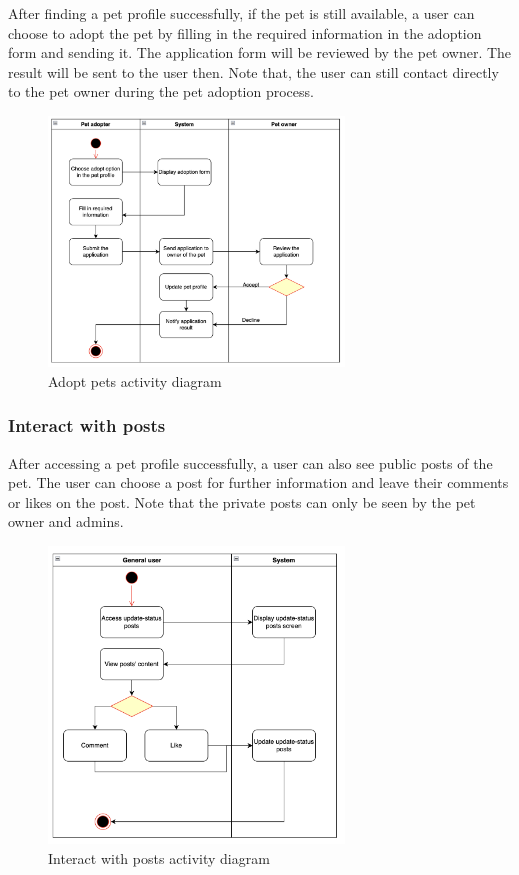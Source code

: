 After finding a pet profile successfully, if the pet is still available, a user can choose to adopt the pet by filling in the required information in the adoption form and sending it. The application form will be reviewed by the pet owner. The result will be sent to the user then. Note that, the user can still contact directly to the pet owner during the pet adoption process.

\begin{figure}[H]
  \centering
  \includegraphics[width=0.7\textwidth]{Figures/adopt_pet.png}
  \caption{Adopt pets activity diagram}
  \label{fig:adopt-pet}
\end{figure}

\subsubsection{Interact with posts}

After accessing a pet profile successfully, a user can also see public posts of the pet. The user can choose a post for further information and leave their comments or likes on the post. Note that the private posts can only be seen by the pet owner and admins.

\begin{figure}[H]
  \centering
  \includegraphics[width=0.7\textwidth]{Figures/post_interact.png}
  \caption{Interact with posts activity diagram}
  \label{fig:interact-post}
\end{figure}

